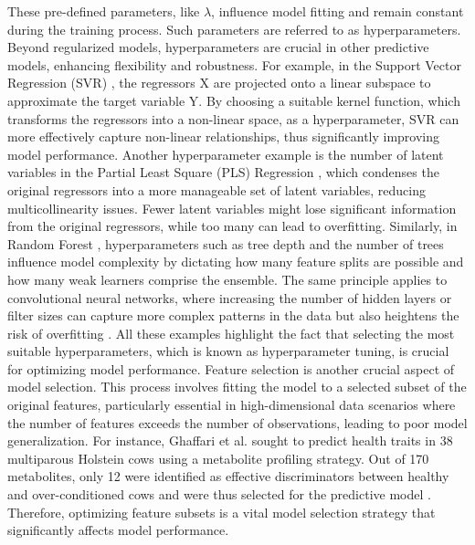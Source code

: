 These pre-defined parameters, like $\lambda$, influence model fitting and remain constant during the training process. Such parameters are referred to as hyperparameters. Beyond regularized models, hyperparameters are crucial in other predictive models, enhancing flexibility and robustness. For example, in the Support Vector Regression (SVR) \citep{drucker_support_1996}, the regressors X are projected onto a linear subspace to approximate the target variable Y. By choosing a suitable kernel function, which transforms the regressors into a non-linear space, as a hyperparameter, SVR can more effectively capture non-linear relationships, thus significantly improving model performance. Another hyperparameter example is the number of latent variables in the Partial Least Square (PLS) Regression \citep{abdi_partial_2003}, which condenses the original regressors into a more manageable set of latent variables, reducing multicollinearity issues. Fewer latent variables might lose significant information from the original regressors, while too many can lead to overfitting. Similarly, in Random Forest \citep{breiman_random_2001}, hyperparameters such as tree depth and the number of trees influence model complexity by dictating how many feature splits are possible and how many weak learners comprise the ensemble. The same principle applies to convolutional neural networks, where increasing the number of hidden layers or filter sizes can capture more complex patterns in the data but also heightens the risk of overfitting \citep{lecun_generalization_1989}. All these examples highlight the fact that selecting the most suitable hyperparameters, which is known as hyperparameter tuning, is crucial for optimizing model performance.
Feature selection is another crucial aspect of model selection. This process involves fitting the model to a selected subset of the original features, particularly essential in high-dimensional data scenarios where the number of features exceeds the number of observations, leading to poor model generalization. For instance, Ghaffari et al. sought to predict health traits in 38 multiparous Holstein cows using a metabolite profiling strategy. Out of 170 metabolites, only 12 were identified as effective discriminators between healthy and over-conditioned cows and were thus selected for the predictive model \citep{ghaffari_metabolomics_2019}. Therefore, optimizing feature subsets is a vital model selection strategy that significantly affects model performance.
